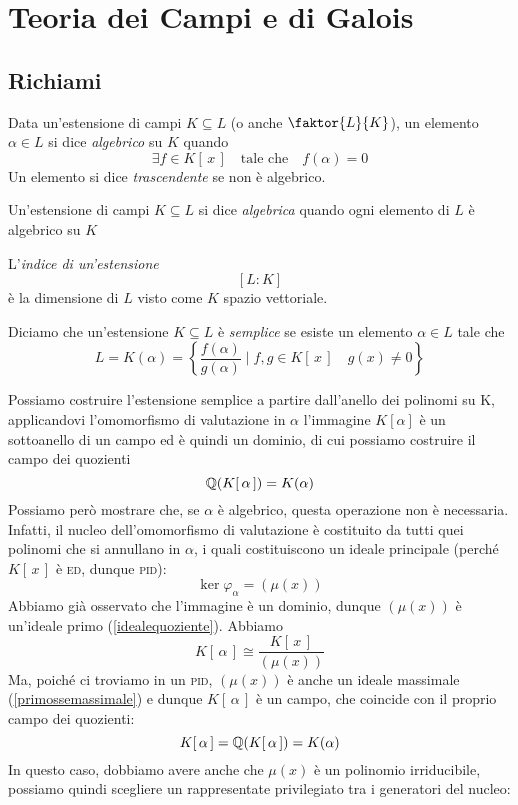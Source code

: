 \setcounter{section}{10} %
\section{Teoria dei Campi e di Galois}

\subsection{Richiami}
\begin{multicols}{2}

\begin{definition}
	Data un'estensione di campi $ K \subseteq L $ (o anche $ \faktor{L}{K} $), un elemento $ \alpha \in L $ si dice \emph{algebrico} su $ K $ quando 
	\[ \exists f \in K[\,x\,] \quad \text{tale che} \quad f(\alpha) = 0 \]
	Un elemento si dice \emph{trascendente} se non è algebrico.
\end{definition}

\begin{definition}
	Un'estensione di campi $ K \subseteq L $ si dice \emph{algebrica} quando ogni elemento di $ L $ è algebrico su $ K $
\end{definition}

\begin{definition}
	L'\emph{indice di un'estensione} $$  [L:K]  $$ è la dimensione di $ L $ visto come $ K $ spazio vettoriale.
\end{definition}

\begin{definition}
	Diciamo che un'estensione $ K \subseteq L $ è \emph{semplice} se esiste un elemento $ \alpha \in L $ tale che
	\[ L = K(\alpha) = \left\{ \frac{f(\alpha)}{g(\alpha)} \mid f, g \in K[\,x\,] \quad g(x) \neq 0  \right\} \]
\end{definition}

Possiamo costruire l'estensione semplice a partire dall'anello dei polinomi su K, applicandovi l'omomorfismo di valutazione in $ \alpha $
l'immagine $ K[\alpha] $ è un sottoanello di un campo ed è quindi un dominio, di cui possiamo costruire il campo dei quozienti
\[ \mathbb{Q}(K[\,\alpha\,]) = K(\alpha) \]
Possiamo però mostrare che, se $ \alpha $ è algebrico, questa operazione non è necessaria. Infatti, il nucleo dell'omomorfismo di valutazione è costituito da tutti quei polinomi che si annullano in $ \alpha $, i quali costituiscono un ideale principale (perché $ K[\,x\,] $ è \textsc{ed}, dunque \textsc{pid}):
\[ \ker\varphi_\alpha = (\mu(x)) \]
Abbiamo già osservato che  l'immagine è un dominio, dunque $ (\mu(x)) $ è un'ideale primo (\ref{idealequoziente}). Abbiamo
\[ K[\,\alpha\,] \cong \frac{K[\,x\,]}{(\mu(x))} \]
Ma, poiché ci troviamo in un \textsc{pid}, $ (\mu(x)) $ è anche un ideale massimale (\ref{primossemassimale}) e dunque $ K[\,\alpha\,] $ è un campo, che coincide con il proprio campo dei quozienti:
\[ K[\,\alpha\,] = \mathbb{Q}(K[\,\alpha\,]) = K(\alpha) \]
In questo caso, dobbiamo avere anche che $ \mu(x) $ è un polinomio irriducibile, possiamo quindi scegliere un rappresentate privilegiato tra i generatori del nucleo:


\end{multicols}
